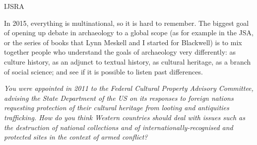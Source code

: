 \begin{labeling}{IJSRA}
\item[RAJ] In 2015, everything is multinational, so it is hard to remember. The biggest goal of opening up debate in archaeology to a global scope (as for example in the JSA, or the series of books that Lynn Meskell and I started for Blackwell) is to mix together people who understand the goals of archaeology very differently: as culture history, as an adjunct to textual history, as cultural heritage, as a branch of social science; and see if it is possible to listen past differences.

\item[IJSRA] \textit{You were appointed in 2011 to the Federal Cultural Property Advisory Committee, advising the State Department of the US on its responses to foreign nations requesting protection of their cultural heritage from looting and antiquities trafficking. How do you think Western countries should deal with issues such as the destruction of national collections and of internationally-recognised and protected sites in the context of armed conflict?}


\end{labeling}
